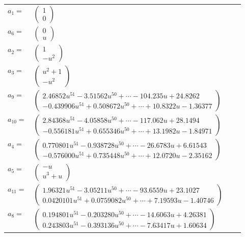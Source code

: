 \documentclass[1p]{elsarticle_modified}
\theoremstyle{definition}
\begin{document}
\begin{tabular}{m{7pt} m{180pt} m{7pt} m{180pt} }
\flushright $a_{1}=$&$\begin{pmatrix}1\\0\end{pmatrix}$ \\
\flushright $a_{6}=$&$\begin{pmatrix}0\\u\end{pmatrix}$ \\
\flushright $a_{2}=$&$\begin{pmatrix}1\\- u^2\end{pmatrix}$ \\
\flushright $a_{3}=$&$\begin{pmatrix}u^2+1\\- u^2\end{pmatrix}$ \\
\flushright $a_{9}=$&$\begin{pmatrix}2.46852 u^{51}-3.51562 u^{50}+\cdots-104.235 u+24.8262\\-0.439906 u^{51}+0.508672 u^{50}+\cdots+10.8322 u-1.36377\end{pmatrix}$ \\
\flushright $a_{10}=$&$\begin{pmatrix}2.84368 u^{51}-4.05858 u^{50}+\cdots-117.062 u+28.1494\\-0.556181 u^{51}+0.655346 u^{50}+\cdots+13.1982 u-1.84971\end{pmatrix}$ \\
\flushright $a_{4}=$&$\begin{pmatrix}0.770801 u^{51}-0.938728 u^{50}+\cdots-26.6783 u+6.61543\\-0.576000 u^{51}+0.735448 u^{50}+\cdots+12.0720 u-2.35162\end{pmatrix}$ \\
\flushright $a_{5}=$&$\begin{pmatrix}- u\\u^3+u\end{pmatrix}$ \\
\flushright $a_{11}=$&$\begin{pmatrix}1.96321 u^{51}-3.05211 u^{50}+\cdots-93.6559 u+23.1027\\0.0420101 u^{51}+0.0759082 u^{50}+\cdots+7.19593 u-1.40746\end{pmatrix}$ \\
\flushright $a_{8}=$&$\begin{pmatrix}0.194801 u^{51}-0.203280 u^{50}+\cdots-14.6063 u+4.26381\\0.243803 u^{51}-0.393136 u^{50}+\cdots-7.63417 u+1.60634\end{pmatrix}$ \\

\end{tabular}
\end{document}
